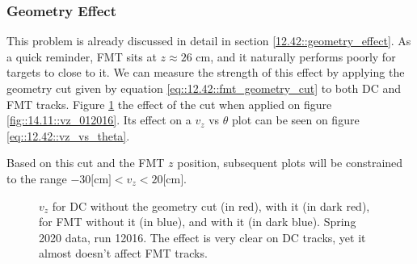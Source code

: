 \subsubsection{Geometry Effect}
\label{14.12::geometry_effect}
    This problem is already discussed in detail in section \ref{12.42::geometry_effect}.
    As a quick reminder, FMT sits at $z \approx 26$ cm, and it naturally performs poorly for targets to close to it.
    We can measure the strength of this effect by applying the geometry cut given by equation \eqref{eq::12.42::fmt_geometry_cut} to both DC and FMT tracks.
    Figure \ref{fig::14.12::vz_012016_geomcut} the effect of the cut when applied on figure \ref{fig::14.11::vz_012016}.
    Its effect on a $v_z$ vs $\theta$ plot can be seen on figure \ref{eq::12.42::vz_vs_theta}.

    Based on this cut and the FMT $z$ position, subsequent plots will be constrained to the range $-30 \text{[cm]} < v_z < 20 \text{[cm]}$.

    \begin{figure}[h!]
        \centering{}
        \caption[$v_z$ for DC and FMT, w/ and w/out the geometry cut, run 12016]{$v_z$ for DC without the geometry cut (in red), with it (in dark red), for FMT without it (in blue), and with it (in dark blue). Spring 2020 data, run 12016. The effect is very clear on DC tracks, yet it almost doesn't affect FMT tracks.}
        \label{fig::14.12::vz_012016_geomcut}
    \end{figure}

